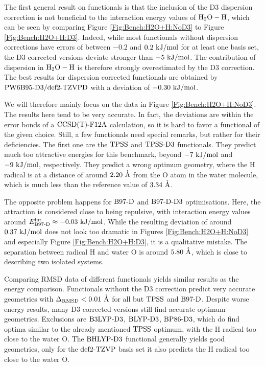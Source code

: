 \documentclass[8.5pt,twoside,twocolumn]{article}
\newcommand\eint{\enmat{E^{\te{int}}}}
\renewcommand{\Ang}{\mathring{\te{A}}}
\newcommand\kmo{\enmat{\te {kJ/mol}}}
\theoremstyle{standard}
\begin{document}
The first general result on functionals is that the inclusion
of the D3 dispersion correction is not beneficial to the interaction
energy values of $\mbox{\ensuremath{\text H _2 \text O-\text H}}$, which can be seen by comparing Figure \ref{Fig:Bench:H2O+H:NoD3}
to Figure \ref{Fig:Bench:H2O+H:D3}. Indeed, while most functionals without
dispersion corrections have errors of between $-0.2$ and $0.2\ \kmo$ for at
least one basis set, the D3 corrected versions deviate stronger than $-5\ \kmo$.
The contribution of dispersion in $\mbox{\ensuremath{\text H _2 \text O-\text H}}$ is therefore strongly overestimated by the
D3 correction. The best results for dispersion corrected functionals are obtained
by $\text{PW6B95}\text{-D3}/\text{def2-TZVPD}$ with a deviation of $-0.30\ \kmo$.

We will therefore mainly focus on the data in Figure \ref{Fig:Bench:H2O+H:NoD3}. 
The results here tend to be very accurate.
In fact, the deviations are within the error bonds of a $\text{CCSD(T)-F12A}$ calculation,
so it is hard to favor a functional of the given choice. Still, a few
functionals need special remarks, but rather for their deficiencies. The first one
are the $\text{TPSS}$ and $\text{TPSS}\text{-D3}$ functionals. They predict much too attractive energies
for this benchmark, beyond $-7\ \kmo$ and $-9\ \kmo$, respectively. 
They predict
a wrong optimum geometry, where the H radical is at a distance of around $2.20\ \Ang$
from the O atom in the water molecule, which is much less than the reference
value of $3.34\ \Ang$. 

The opposite problem happens for $\text{B97-D}$ and $\text{B97-D}\text{-D3}$ optimisations. Here, the attraction is
considered close to being repulsive, with interaction energy values around
\mbox{$\eint_{\bns}\approx -0.03\ \kmo$}. While the resulting deviation of around
$0.37\ \kmo$ does not look too dramatic in Figures \ref{Fig:Bench:H2O+H:NoD3} and
especially Figure \ref{Fig:Bench:H2O+H:D3}, it is a qualitative mistake. The
separation between radical H and water O is around $5.80\ \Ang$, which is close to describing two isolated
systems.

Comparing RMSD data of different functionals yields similar results as the energy comparison.
Functionals without the D3 correction
predict very accurate geometries with \mbox{$\DRMSD < 0.01\ \Ang$} for all but
$\text{TPSS}$ and $\text{B97-D}$.
Despite worse energy results, many D3 corrected versions still find accurate optimum geometries.
Exclusions are $\text{B3LYP}\text{-D3}$, $\text{BLYP}\text{-D3}$, $\text{BP86}\text{-D3}$, which do find optima similar to the already mentioned
$\text{TPSS}$ optimum, with the H radical too close to the water O.
The $\text{BHLYP}\text{-D3}$ functional generally yields good geometries, only for the
$\text{def2-TZVP}$ basis set it also predicts the H radical too close to the water O.
\end{document}
